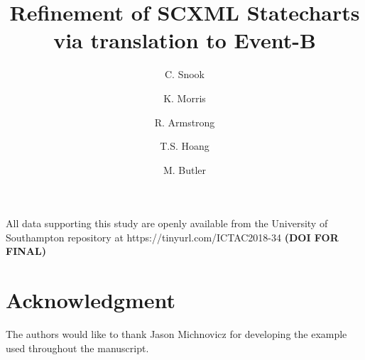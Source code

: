 \documentclass[runningheads,a4paper]{llncs}
\begin{document}
\mainmatter  %

\title{Refinement of SCXML Statecharts via translation to Event-B}


%
\author{C. Snook  %
\and K. Morris  
\and R. Armstrong 
\and T.S. Hoang 
\and M. Butler  
}




\maketitle

\resetabbrev



















\begin{footnotesize} %
	\vspace{6 pt}
	\noindent
	All data supporting this study are openly available from the University of Southampton repository at
	https://tinyurl.com/ICTAC2018-34    \textbf{(DOI FOR FINAL)}
\section*{Acknowledgment} The authors would like to thank Jason Michnovicz for developing the \IDS example used throughout the manuscript.

\par

\end{footnotesize} %




\end{document}
